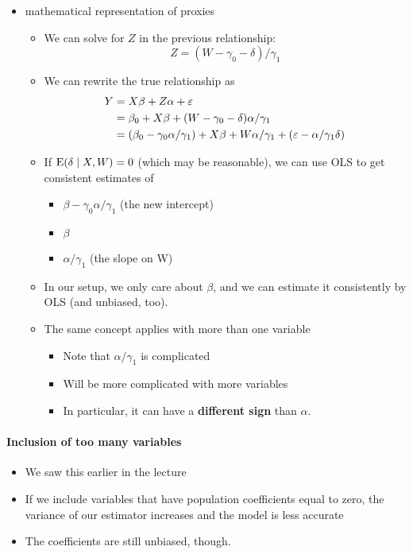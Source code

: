 \begin{itemize}

\item mathematical representation of proxies
\begin{itemize}
\item We can solve for $Z$ in the previous relationship:
  \[ Z = (W - \gamma_0 - \delta ) / \gamma_1 \]
\item We can rewrite the true relationship as
  \begin{align*} 
    Y &= X\beta + Z\alpha + \varepsilon \\
    &= \beta_0 + X\beta + (W - \gamma_0 - \delta) \alpha/\gamma_1 \\
    &= (\beta_0 - \gamma_0\alpha/\gamma_1) + X\beta + W \alpha/\gamma_1 + (\varepsilon - \alpha/\gamma_1\delta)
  \end{align*}
\item If $\operatorname{E}(\delta \mid X, W) = 0$ (which may be reasonable), we
           can use OLS to get consistent estimates of
\begin{itemize}
\item $\beta-\gamma_0\alpha/\gamma_1$ (the new intercept)
\item $\beta$
\item $\alpha/\gamma_1$ (the slope on W)
\end{itemize}
\item In our setup, we only care about $\beta$, and we can
           estimate it consistently by OLS (and unbiased, too).
\item The same concept applies with more than one variable
\begin{itemize}
\item Note that $\alpha/\gamma_1$ is complicated
\item Will be more complicated with more variables
\item In particular, it can have a \textbf{different sign} than $\alpha$.
\end{itemize}
\end{itemize}
\end{itemize}

\paragraph{Inclusion of too many variables}
\begin{itemize}
\item We saw this earlier in the lecture
\item If we include variables that have population coefficients equal
        to zero, the variance of our estimator increases and the model
        is less accurate
\item The coefficients are still unbiased, though.
\end{itemize}
